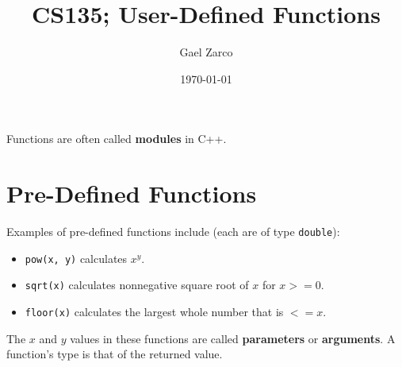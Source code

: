 \documentclass{article}
\title{CS135; User-Defined Functions}
\author{Gael Zarco}
\date{\today}
\begin{document}
\maketitle

Functions are often called \textbf{modules} in C++.

\section{Pre-Defined Functions}
Examples of pre-defined functions include (each are of type \texttt{double}):
\begin{itemize}
  \item \texttt{pow(x, y)} calculates $x^y$.
  \item \texttt{sqrt(x)} calculates nonnegative square root of $x$ for $x >= 0$.
  \item \texttt{floor(x)} calculates the largest whole number that is $<=x$.
\end{itemize}
The $x$ and $y$ values in these functions are called \textbf{parameters} or
\textbf{arguments}. A function's type is that of the returned value.
\end{document}
